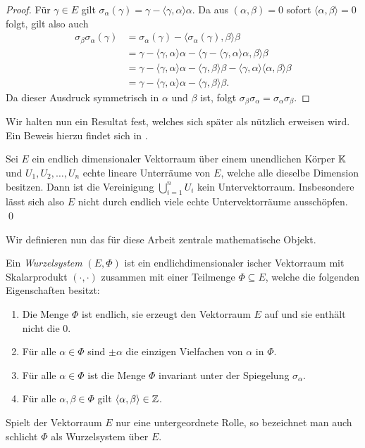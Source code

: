 \begin{proof}
  Für $\gamma \in E$ gilt $\sigma_\alpha(\gamma) = \gamma - \langle \gamma, \alpha \rangle \alpha$. Da aus $(\alpha, \beta) = 0$ sofort $\langle \alpha, \beta \rangle = 0$ folgt, gilt also auch
  \begin{align*}
    \sigma_\beta \sigma_\alpha(\gamma) 
    &= \sigma_\alpha(\gamma) - \langle \sigma_\alpha(\gamma), \beta \rangle \beta \\
    &= \gamma - \langle \gamma, \alpha \rangle \alpha 
              - \langle \gamma- \langle \gamma, \alpha\rangle \alpha, \beta \rangle \beta \\
    &= \gamma - \langle \gamma, \alpha \rangle \alpha 
              - \langle \gamma, \beta \rangle \beta - \langle \gamma, \alpha \rangle \langle \alpha, \beta \rangle \beta \\
    &= \gamma - \langle \gamma, \alpha \rangle \alpha - \langle \gamma, \beta \rangle \beta.
  \end{align*} 
  Da dieser Ausdruck symmetrisch in $\alpha$ und $\beta$ ist, folgt $\sigma_\beta \sigma_\alpha = \sigma_\alpha \sigma_\beta$.
\end{proof}

Wir halten nun ein Resultat fest, welches sich später als nützlich erweisen wird. Ein Beweis hierzu findet sich in \cite[S.123 und S.242]{erdmann2006introduction}.

\begin{prop}
  \label{prop:unterraumAusschoepfung} 
  Sei $E$ ein endlich dimensionaler Vektorraum über einem unendlichen Körper $\mathbb{K}$ und $U_1, U_2, \dots, U_n$ echte lineare Unterräume von $E$, welche alle dieselbe Dimension besitzen.
  Dann ist die Vereinigung $\bigcup_{i=1}^n U_i$ kein Untervektorraum.
  Insbesondere lässt sich also $E$ nicht durch endlich viele echte Untervektorräume ausschöpfen.
  \qed
\end{prop}

Wir definieren nun das für diese Arbeit zentrale mathematische Objekt.

\begin{defn}
  Ein \emph{Wurzelsystem} $(E,\Phi)$ ist ein endlichdimensionaler \euklid ischer Vektorraum mit Skalarprodukt $(\cdot,\cdot)$ zusammen mit einer Teilmenge $\Phi \subseteq E$, welche die folgenden Eigenschaften besitzt:
  \begin{enumerate}[(R1)]
    \item\label{it:R1} Die Menge $\Phi$ ist endlich, sie erzeugt den Vektorraum $E$ auf und sie enthält nicht die $0$.
    \item\label{it:R2} Für alle $\alpha \in \Phi$ sind $\pm \alpha$ die einzigen Vielfachen von $\alpha$ in $\Phi$.
    \item\label{it:R3} Für alle $\alpha \in \Phi$ ist die Menge $\Phi$ invariant unter der Spiegelung $\sigma_\alpha$.
    \item\label{it:R4} Für alle $\alpha, \beta \in \Phi$ gilt $\langle \alpha, \beta \rangle \in \mathbb{Z}$.
  \end{enumerate}
  Spielt der Vektorraum $E$ nur eine untergeordnete Rolle, so bezeichnet man auch schlicht $\Phi$ als Wurzelsystem über $E$.
\end{defn}


